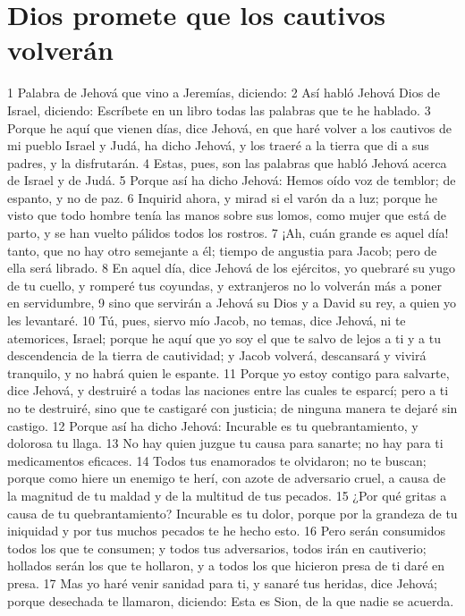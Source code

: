 \section*{Dios promete que los cautivos volverán}

1 Palabra de Jehová que vino a Jeremías, diciendo:
2 Así habló Jehová Dios de Israel, diciendo: Escríbete en un libro todas las palabras que te he hablado.
3 Porque he aquí que vienen días, dice Jehová, en que haré volver a los cautivos de mi pueblo Israel y Judá, ha dicho Jehová, y los traeré a la tierra que di a sus padres, y la disfrutarán.
4 Estas, pues, son las palabras que habló Jehová acerca de Israel y de Judá.
5 Porque así ha dicho Jehová: Hemos oído voz de temblor; de espanto, y no de paz.
6 Inquirid ahora, y mirad si el varón da a luz; porque he visto que todo hombre tenía las manos sobre sus lomos, como mujer que está de parto, y se han vuelto pálidos todos los rostros.
7 ¡Ah, cuán grande es aquel día! tanto, que no hay otro semejante a él; tiempo de angustia para Jacob; pero de ella será librado.
8 En aquel día, dice Jehová de los ejércitos, yo quebraré su yugo de tu cuello, y romperé tus coyundas, y extranjeros no lo volverán más a poner en servidumbre,
9 sino que servirán a Jehová su Dios y a David su rey, a quien yo les levantaré.
10 Tú, pues, siervo mío Jacob, no temas, dice Jehová, ni te atemorices, Israel; porque he aquí que yo soy el que te salvo de lejos a ti y a tu descendencia de la tierra de cautividad; y Jacob volverá, descansará y vivirá tranquilo, y no habrá quien le espante.
11 Porque yo estoy contigo para salvarte, dice Jehová, y destruiré a todas las naciones entre las cuales te esparcí; pero a ti no te destruiré, sino que te castigaré con justicia; de ninguna manera te dejaré sin castigo. 
12 Porque así ha dicho Jehová: Incurable es tu quebrantamiento, y dolorosa tu llaga.
13 No hay quien juzgue tu causa para sanarte; no hay para ti medicamentos eficaces.
14 Todos tus enamorados te olvidaron; no te buscan; porque como hiere un enemigo te herí, con azote de adversario cruel, a causa de la magnitud de tu maldad y de la multitud de tus pecados.
15 ¿Por qué gritas a causa de tu quebrantamiento? Incurable es tu dolor, porque por la grandeza de tu iniquidad y por tus muchos pecados te he hecho esto.
16 Pero serán consumidos todos los que te consumen; y todos tus adversarios, todos irán en cautiverio; hollados serán los que te hollaron, y a todos los que hicieron presa de ti daré en presa.
17 Mas yo haré venir sanidad para ti, y sanaré tus heridas, dice Jehová; porque desechada te llamaron, diciendo: Esta es Sion, de la que nadie se acuerda.
